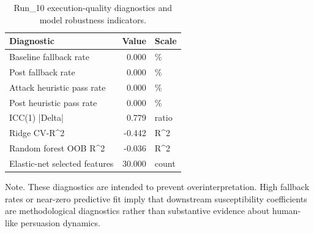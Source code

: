 \begin{table}[htbp]
\centering
\begin{threeparttable}
\caption{Run\_10 execution-quality diagnostics and model robustness indicators.}
\label{tab:qualitydiag}
\small
\setlength{\tabcolsep}{4.5pt}
\renewcommand{\arraystretch}{1.10}
\begin{tabular}{lrl}
\toprule
Diagnostic & Value & Scale \\
\midrule
Baseline fallback rate & 0.000 & \% \\
Post fallback rate & 0.000 & \% \\
Attack heuristic pass rate & 0.000 & \% \\
Post heuristic pass rate & 0.000 & \% \\
ICC(1) |Delta| & 0.779 & ratio \\
Ridge CV-R\textasciicircum 2 & -0.442 & R\textasciicircum 2 \\
Random forest OOB R\textasciicircum 2 & -0.036 & R\textasciicircum 2 \\
Elastic-net selected features & 30.000 & count \\
\bottomrule
\end{tabular}
\begin{tablenotes}[flushleft]
\footnotesize
\item Note. These diagnostics are intended to prevent overinterpretation. High fallback rates or near-zero predictive fit imply that downstream susceptibility coefficients are methodological diagnostics rather than substantive evidence about human-like persuasion dynamics.
\end{tablenotes}
\end{threeparttable}
\end{table}